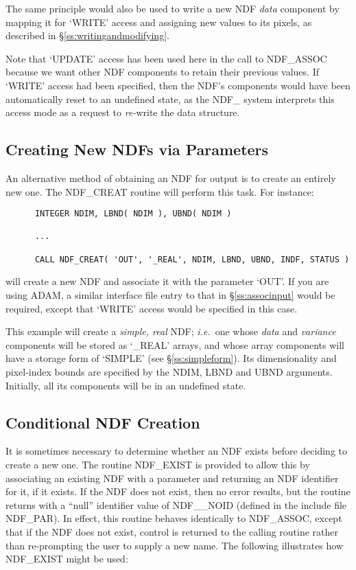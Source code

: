 \documentclass[twoside,11pt]{article}
\newcommand{\htmlref}[2]{#1}
\newcommand{\xref}[3]{#1}
\newcommand{\xlabel}[1]{}
\newcommand{\st}[1]{{\em{#1}}}
\begin{document}
The same principle would also be used to write a new NDF \st{data\/}
component by mapping it for `WRITE' access and assigning new values to its
pixels, as described in \S\ref{ss:writingandmodifying}. 

Note that `UPDATE' access has been used here in the call to NDF\_ASSOC
because we want other NDF components to retain their previous values. 
If `WRITE' access had been specified, then the NDF's components would have
been automatically reset to an undefined state, as the NDF\_ system
interprets this access mode as a request to \st{re-\/}write the data
structure. 

\subsection{\xlabel{creating_new_ndfs_via_parameters}\label{ss:creatingndfs}Creating New NDFs via Parameters}

An alternative method of obtaining an NDF for output is to create an
entirely new one. 
The \htmlref{NDF\_CREAT}{NDF_CREAT} routine will perform this task.
For instance:

\small
\begin{verbatim}
      INTEGER NDIM, LBND( NDIM ), UBND( NDIM )

      ...

      CALL NDF_CREAT( 'OUT', '_REAL', NDIM, LBND, UBND, INDF, STATUS )
\end{verbatim}
\normalsize

will create a new NDF and associate it with the parameter `OUT'.  If
you are using \xref{ADAM}{sg4}{}, a similar interface file entry to that in
\S\ref{ss:associnput} would be required, except that `WRITE' access
would be specified in this case.

This example will create a \st{simple, real\/} NDF; \st{i.e.}\ one whose
\st{data\/} and \st{variance\/} components will be stored as `\_REAL'
arrays, and whose array components will have a storage form of `SIMPLE' (see
\S\ref{ss:simpleform}). 
Its dimensionality and pixel-index bounds are specified by the NDIM, LBND
and UBND arguments. 
Initially, all its components will be in an undefined state.

\subsection{\xlabel{conditional_ndf_creation}\label{ss:exist}Conditional NDF Creation}

It is sometimes necessary to determine whether an NDF exists before deciding
to create a new one. 
The routine \htmlref{NDF\_EXIST}{NDF_EXIST} is provided to allow this by associating an existing
NDF with a parameter and returning an NDF identifier for it, if it
exists. 
If the NDF does not exist, then no error results, but the routine returns
with a ``null'' identifier value of NDF\_\_NOID (defined in the include file
NDF\_PAR). 
In effect, this routine behaves identically to \htmlref{NDF\_ASSOC}{NDF_ASSOC}, except that if
the NDF does not exist, control is returned to the calling routine rather
than re-prompting the user to supply a new name. 
The following illustrates how NDF\_EXIST might be used:
\end{document}
